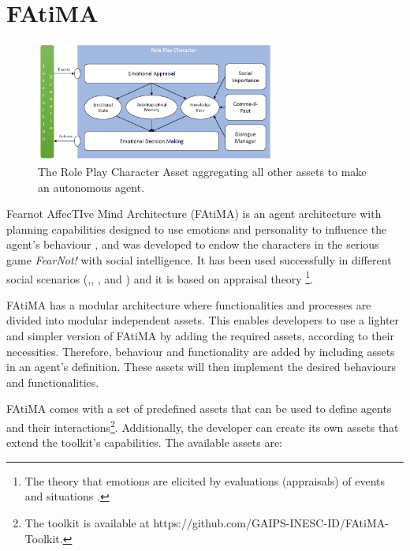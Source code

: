 \section{FAtiMA}
\label{section:fatima}

\begin{figure}
  \includegraphics[width=0.7\textwidth]{./Images/rpc}
  \caption{The Role Play Character Asset aggregating all other assets to make an autonomous agent.}
  \label{fig:rpc}
\end{figure}

Fearnot AffecTIve Mind Architecture (FAtiMA) is an agent architecture with planning capabilities designed to use emotions and personality to influence the agent's behaviour \cite{dias:fatima-modular}, and was developed to endow the characters in the serious game \textit{FearNot!} \cite{aylett:fearnot} with social intelligence.
It has been used successfully in different social scenarios (\cite{paiva:learning-by-feeling},\cite{rodrigues:i-can-feel-to}, \cite{aylett:intercultural-empathy}, and \cite{correia:sueca}) and it is based on appraisal theory \footnote{The theory that emotions are elicited by evaluations (appraisals) of events and situations \cite{roseman:appraisal}.}.

FAtiMA has a modular architecture where functionalities and processes are divided into modular independent assets.
This enables developers to use a lighter and simpler version of FAtiMA by adding the required assets, according to their necessities.
Therefore, behaviour and functionality are added by including assets in an agent's definition.
These assets will then implement the desired behaviours and functionalities.

FAtiMA comes with a set of predefined assets that can be used to define agents and their interactions\footnote{The toolkit is available at https://github.com/GAIPS-INESC-ID/FAtiMA-Toolkit.}.
Additionally, the developer can create its own assets that extend the toolkit's capabilities.
The available assets are:

